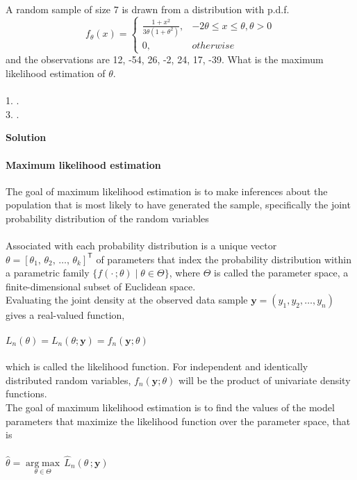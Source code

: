 \documentclass[journal,12pt,twocolumn]{IEEEtran}
\begin{document}
\begin{enumerate}[label=\arabic*.,ref=\theenumi]
A random sample of size 7 is drawn from a distribution with p.d.f. \\ 
\[
    f_\theta(x)= 
\begin{cases}
\frac{1 + x^2}{3\theta(1+\theta^2)},& -2\theta \leq x \leq \theta, \theta > 0\\
    0,              & otherwise
\end{cases}
\]
and the observations are 12, -54, 26, -2, 24, 17, -39. What is the maximum likelihood estimation of \(\theta\).
\\\\
1. \quad \quad \quad {}. \\ 3. \quad \quad \quad {}.

\textbf{Solution} \\
\paragraph{Maximum likelihood estimation}The goal of maximum likelihood estimation is to make inferences about the population that is most likely to have generated the sample, specifically the joint probability distribution of the random variables
\paragraph{}
Associated with each probability distribution is a unique vector \( \theta =\left[\theta _{1},\,\theta _{2},\,\ldots ,\,\theta _{k}\right]^{\mathsf {T}}\) of parameters that index the probability distribution within a parametric family \( \{f(\cdot \,;\theta )\mid \theta \in \Theta \}\), where \( \Theta \)  is called the parameter space, a finite-dimensional subset of Euclidean space.\\
Evaluating the joint density at the observed data sample \( \mathbf {y} =(y_{1},y_{2},\ldots ,y_{n})\) gives a real-valued function,
\\\\
\({\displaystyle L_{n}(\theta )=L_{n}(\theta ;\mathbf {y} )=f_{n}(\mathbf {y} ;\theta )}\)
\paragraph{}
which is called the likelihood function. For independent and identically distributed random variables, \( f_{n}(\mathbf {y} ;\theta )\)  will be the product of univariate density functions.\\

The goal of maximum likelihood estimation is to find the values of the model parameters that maximize the likelihood function over the parameter space, that is
\\\\
\({\hat {\theta }}={\underset {\theta \in \Theta }{\operatorname {arg\;max} }}\,{\widehat {L}}_{n}(\theta \,;\mathbf {y} )\)

\end{enumerate}
\end{document}
